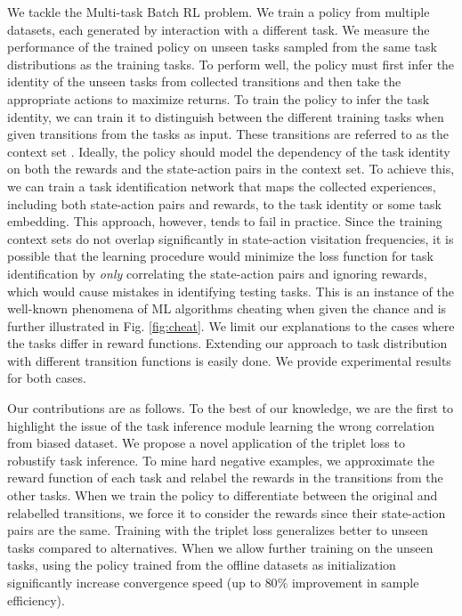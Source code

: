 We tackle the Multi-task Batch RL problem.
We train a policy from multiple datasets, each generated by interaction with a different task.
We measure the performance of the trained policy on unseen tasks sampled from the same task distributions as the training tasks.
To perform well, the policy must first infer the identity of the unseen tasks from collected transitions and then take the appropriate actions to maximize returns.
To train the policy to infer the task identity, we can train it to distinguish between the different training tasks when given transitions from the tasks as input.
These transitions are referred to as the context set \cite{rakelly2019efficient}.
Ideally, the policy should model the dependency of the task identity on both the rewards and the state-action pairs in the context set.
To achieve this, we can train a task identification network that maps the collected experiences, including both state-action pairs and rewards, to the task identity or some task embedding.
This approach, however, tends to fail in practice.
Since the training context sets do not overlap significantly in state-action visitation frequencies, it is possible that the learning procedure would minimize the loss function for task identification by \textit{only} correlating the state-action pairs and ignoring rewards, which would cause mistakes in identifying testing tasks.
This is an instance of the well-known phenomena of ML algorithms cheating when given the chance \cite{chu2017cyclegan} and is further illustrated in Fig. \ref{fig:cheat}.
We limit our explanations to the cases where the tasks differ in reward functions. Extending our approach to task distribution with different transition functions is easily done. We provide experimental results for both cases.

Our contributions are as follows.
To the best of our knowledge, we are the first to highlight the issue of the task inference module learning the wrong correlation from biased dataset.
We propose a novel application of the triplet loss to robustify task inference.
To mine hard negative examples, we approximate the reward function of each task and relabel the rewards in the transitions from the other tasks.
When we train the policy to differentiate between the original and relabelled transitions, we force it to consider the rewards since their state-action pairs are the same.
Training with the triplet loss generalizes better to unseen tasks compared to alternatives.
When we allow further training on the unseen tasks, using the policy trained from the offline datasets as initialization significantly increase convergence speed (up to $80\%$ improvement in sample efficiency).

